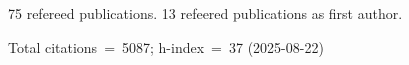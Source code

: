 75 refereed publications. 13 refeered publications as first author.

Total citations~=~5087; h-index~=~37 (2025-08-22)